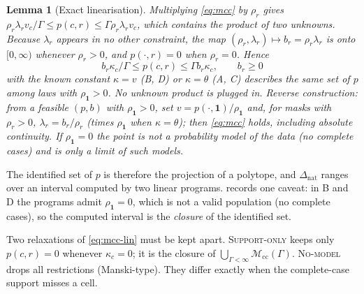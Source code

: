 \documentclass{article}
\theoremstyle{plain}
\newtheorem{lemma}[theorem]{Lemma}
\theoremstyle{definition}
\theoremstyle{remark}
\newcommand{\one}{\mathbf{1}}
\newcommand{\Dnat}{\Delta_{\mathrm{nat}}}
\newcommand{\Mcc}{\mathcal{M}_{\mathrm{cc}}}
\begin{document}
\begin{lemma}[Exact linearisation]\label{lem:linear}
Multiplying \eqref{eq:mcc} by $\rho_r$ gives
$\rho_r\lambda_r v_c/\Gamma\le p(c,r)\le\Gamma\rho_r\lambda_r v_c$, which contains
the product of two unknowns. Because $\lambda_r$ appears in no other
constraint, the map $(\rho_r,\lambda_r)\mapsto b_r=\rho_r\lambda_r$ is onto
$[0,\infty)$ whenever $\rho_r>0$, and $p(\cdot,r)=0$ when $\rho_r=0$. Hence
\begin{equation}\label{eq:mcc-lin}
b_r\kappa_c/\Gamma\le p(c,r)\le\Gamma b_r\kappa_c,\qquad b_r\ge 0
\end{equation}
with the known constant $\kappa=v$ (B, D) or $\kappa=\theta$ (A, C) describes
the same set of $p$ among laws with $\rho_{\one}>0$. No unknown product is
plugged in. Reverse construction: from a feasible $(p,b)$ with $\rho_{\one}>0$,
set $v=p(\cdot,\one)/\rho_{\one}$ and, for masks with $\rho_r>0$,
$\lambda_r=b_r/\rho_r$ (times $\rho_{\one}$ when $\kappa=\theta$); then
\eqref{eq:mcc} holds, including absolute continuity. If $\rho_{\one}=0$ the
point is not a probability model of the data (no complete cases) and is only
a limit of such models.
\end{lemma}

The identified set of $p$ is therefore the projection of a polytope, and
$\Dnat$ ranges over an interval computed by two linear programs.
 records one caveat: in B and D the programs admit
$\rho_{\one}=0$, which is not a valid population (no complete cases), so
the computed interval is the \emph{closure} of the identified set.

Two relaxations of \eqref{eq:mcc-lin} must be kept apart. \textsc{Support-only}
keeps only $p(c,r)=0$ whenever $\kappa_c=0$; it is the closure of
$\bigcup_{\Gamma<\infty}\Mcc(\Gamma)$. \textsc{No-model} drops all
restrictions (Manski-type). They differ exactly when the complete-case
support misses a cell.
\end{document}
